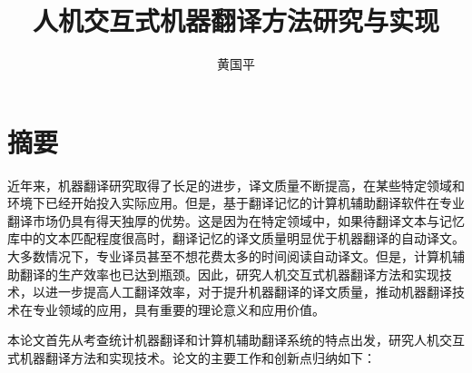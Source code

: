 
  \confidential{} %
  \title[人机交互式机器翻译方法研究与实现]{人机交互式机器翻译方法研究与实现}
  \author{黄国平} %


\maketitle

\makeenglishtitle

\makedeclaration

\chapter{摘要}%
近年来，机器翻译研究取得了长足的进步，译文质量不断提高，在某些特定领域和环境下已经开始投入实际应用。但是，基于翻译记忆的计算机辅助翻译软件在专业翻译市场仍具有得天独厚的优势。这是因为在特定领域中，如果待翻译文本与记忆库中的文本匹配程度很高时，翻译记忆的译文质量明显优于机器翻译的自动译文。大多数情况下，专业译员甚至不想花费太多的时间阅读自动译文。但是，计算机辅助翻译的生产效率也已达到瓶颈。因此，研究人机交互式机器翻译方法和实现技术，以进一步提高人工翻译效率，对于提升机器翻译的译文质量，推动机器翻译技术在专业领域的应用，具有重要的理论意义和应用价值。

本论文首先从考查统计机器翻译和计算机辅助翻译系统的特点出发，研究人机交互式机器翻译方法和实现技术。论文的主要工作和创新点归纳如下：

